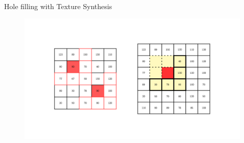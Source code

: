 \documentclass{beamer}
\begin{document}
\begin{frame}{Hole filling with Texture Synthesis}
    \begin{figure}[h]
        \centering
        \includegraphics[width=1\textwidth]{4.png} %
        \captionsetup{labelformat=empty}
    \end{figure}
\end{frame}
\end{document}
